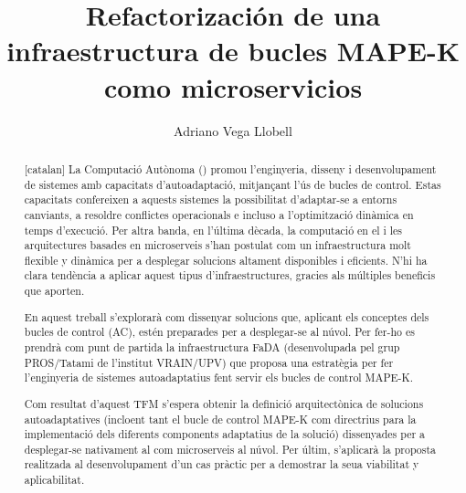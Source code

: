 \documentclass[11pt,spanish,listoffigures,listoftables,listlistings]{\relativepath/tfgetsinf}
\title{Refactorización de una infraestructura de bucles MAPE-K como microservicios}
\author{Adriano Vega Llobell}
\begin{document}



\begin{abstract}[catalan]
  La Computació Autònoma () promou l'enginyeria, disseny i desenvolupament de sistemes amb capacitats d'autoadaptació, mitjançant l'ús de bucles de control. Estas capacitats confereixen a aquests sistemes la possibilitat d'adaptar-se a entorns canviants, a resoldre conflictes operacionals e incluso a l'optimització dinàmica en temps d'execució. Per altra banda, en l'última dècada, la computació en el  i les arquitectures basades en microserveis s'han postulat com un infraestructura molt flexible y dinàmica per a desplegar solucions altament disponibles i eficients. N'hi ha clara tendència a aplicar aquest tipus d'infraestructures, gracies als múltiples beneficis que aporten.

  En aquest treball s'explorarà com dissenyar solucions que, aplicant els conceptes dels bucles de control (AC), estén preparades per a desplegar-se al núvol. Per fer-ho es prendrà com punt de partida la infraestructura FaDA (desenvolupada pel grup PROS/Tatami de l'institut VRAIN/UPV) que proposa una estratègia per fer l'enginyeria de sistemes autoadaptatius fent servir els bucles de control MAPE-K.

  Com resultat d'aquest TFM s'espera obtenir la definició arquitectònica de solucions autoadaptatives (incloent tant el bucle de control MAPE-K com directrius para la implementació dels diferents components adaptatius de la solució) dissenyades per a desplegar-se nativament al com microserveis al núvol. Per últim, s'aplicarà la proposta realitzada al desenvolupament d'un cas pràctic per a demostrar la seua viabilitat y aplicabilitat.
\end{abstract}
\end{document}
